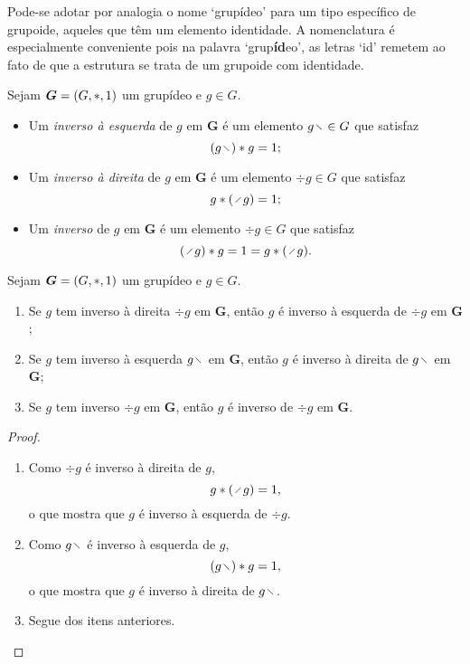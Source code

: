 Pode-se adotar por analogia o nome `grupídeo' para um tipo específico de grupoide, aqueles que têm um elemento identidade. A nomenclatura é especialmente conveniente pois na palavra `grup\textbf{íd}eo', as letras `id' remetem ao fato de que a estrutura se trata de um grupoide com identidade.

\begin{definition}[Inverso]
Sejam $\bm G = (G,\ast,1)$ um grupídeo e $g \in G$.
	\begin{itemize}
	\item Um \emph{inverso à esquerda} de $g$ em $\bm G$ é um elemento $g \vid \in G$ que satisfaz
		\begin{equation*}
		(g \vid) \opb g = \id;
		\end{equation*}
	
	\item Um \emph{inverso à direita} de $g$ em $\bm G$ é um elemento $\div g \in G$ que satisfaz
		\begin{equation*}
		g \opb (\div g) = \id;
		\end{equation*}
	
	\item Um \emph{inverso} de $g$ em $\bm G$ é um elemento $\div g \in G$ que satisfaz
		\begin{equation*}
		(\div g) \opb g = \id = g \opb (\div g).
		\end{equation*}
	\end{itemize}
\end{definition}

\begin{proposition}
Sejam $\bm G = (G,\ast,1)$ um grupídeo e $g \in G$.
	\begin{enumerate}
		\item Se $g$ tem inverso à direita $\div g$ em $\bm G$, então $g$ é inverso à esquerda de $\div g$ em $\bm G$;
		\item Se $g$ tem inverso à esquerda $g \vid$ em $\bm G$, então $g$ é inverso à direita de $g \vid$ em $\bm G$;
		\item Se $g$ tem inverso $\div g$ em $\bm G$, então $g$ é inverso de $\div g$ em $\bm G$.
	\end{enumerate}
\end{proposition}
\begin{proof}
	\begin{enumerate}
	\item Como $\div g$ é inverso à direita de $g$,
		\begin{equation*}
		g \opb (\div g) = \id,
		\end{equation*}
	o que mostra que $g$ é inverso à esquerda de $\div g$.
	\item Como $g \vid$ é inverso à esquerda de $g$,
		\begin{equation*}
		(g \vid) \opb g = \id,
		\end{equation*}
	o que mostra que $g$ é inverso à direita de $g \vid$.
	\item Segue dos itens anteriores.
	\qedhere
	\end{enumerate}
\end{proof}

